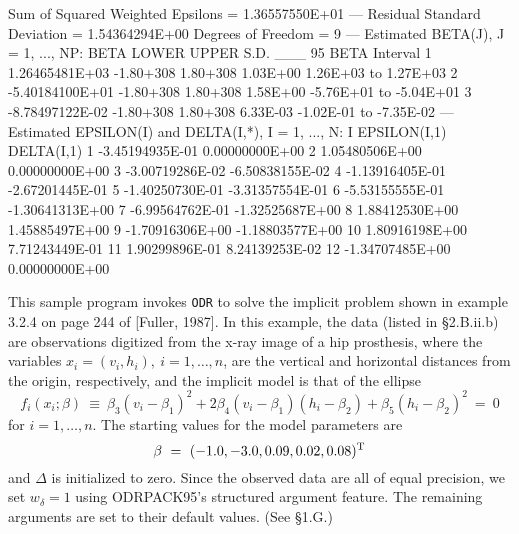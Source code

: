 {{         Sum of Squared Weighted Epsilons =    1.36557550E+01
\phantom{blank line}
 --- Residual Standard Deviation          =                     1.54364294E+00
         Degrees of Freedom               =    9
\phantom{blank line}
 --- Estimated BETA(J), J = 1, ..., NP:
\phantom{blank line}
                     BETA      LOWER     UPPER      S.D.  ___ 95%
                                                    BETA         Interval
\phantom{blank line}
       1   1.26465481E+03  -1.80+308  1.80+308  1.03E+00   1.26E+03 to  1.27E+03
       2  -5.40184100E+01  -1.80+308  1.80+308  1.58E+00  -5.76E+01 to -5.04E+01
       3  -8.78497122E-02  -1.80+308  1.80+308  6.33E-03  -1.02E-01 to -7.35E-02
\phantom{blank line}
 --- Estimated EPSILON(I) and DELTA(I,*), I = 1, ..., N:
\phantom{blank line}
         I    EPSILON(I,1)      DELTA(I,1)
\phantom{blank line}
         1 -3.45194935E-01  0.00000000E+00
         2  1.05480506E+00  0.00000000E+00
         3 -3.00719286E-02 -6.50838155E-02
         4 -1.13916405E-01 -2.67201445E-01
         5 -1.40250730E-01 -3.31357554E-01
         6 -5.53155555E-01 -1.30641313E+00
         7 -6.99564762E-01 -1.32525687E+00
         8  1.88412530E+00  1.45885497E+00
         9 -1.70916306E+00 -1.18803577E+00
        10  1.80916198E+00  7.71243449E-01
        11  1.90299896E-01  8.24139253E-02
        12 -1.34707485E+00  0.00000000E+00
}}
\vfil\eject

\medskip

\noindent This sample program invokes {\tt ODR} to solve the implicit
problem shown in example 3.2.4 on page 244 of [Fuller, 1987]. In this
example, the data (listed in \S 2.B.ii.b) are observations digitized
from the x-ray image of a hip prosthesis, where the variables
$x_i=(v_i,h_i),\ i=1,\ldots,n$, are the vertical and horizontal distances from the origin, respectively, and the implicit model is that of the ellipse 
$$f_i(x_i;\beta)\ \equiv\
\beta_3(v_i-\beta_1)^2+2\beta_4(v_i-\beta_1)(h_i-\beta_2)+\beta_5(h_i-\beta_2)^2\ =\ 0$$
for $i = 1,\ldots,n$. The starting values for the model parameters are
$$\beta\ =\ (-1.0,-3.0,0.09,0.02,0.08)^{\rm T}$$
and $\Delta$ is initialized to zero. Since the observed data are all of equal
precision, we set $w_\delta=1$ using ODRPACK95's structured argument feature. The remaining arguments are set to their default values. (See \S 1.G.)

\bigskip{}

